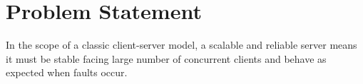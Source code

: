 \chapter{Problem Statement}\label{ch2}

In the scope of a classic client-server model, a scalable and reliable server means it must be stable facing large number of concurrent clients and behave as expected when faults occur.